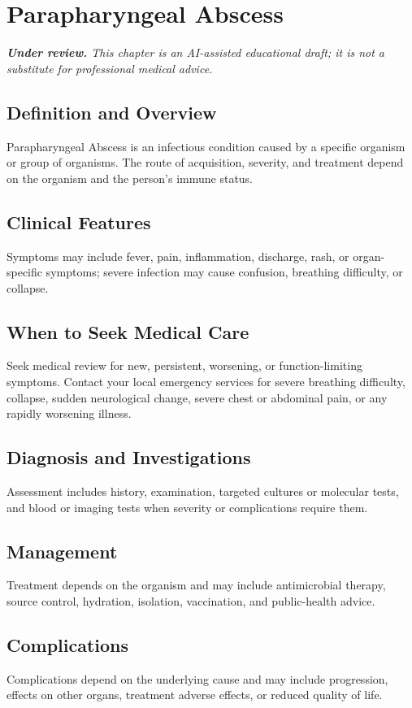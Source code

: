 \chapter{Parapharyngeal Abscess}

\medskip
\noindent\textit{\textbf{Under review.} This chapter is an AI-assisted educational draft; it is not a substitute for professional medical advice.}

\section*{Definition and Overview}
Parapharyngeal Abscess is an infectious condition caused by a specific organism or group of organisms. The route of acquisition, severity, and treatment depend on the organism and the person's immune status.

\section*{Clinical Features}
Symptoms may include fever, pain, inflammation, discharge, rash, or organ-specific symptoms; severe infection may cause confusion, breathing difficulty, or collapse.

\section*{When to Seek Medical Care}
Seek medical review for new, persistent, worsening, or function-limiting symptoms. Contact your local emergency services for severe breathing difficulty, collapse, sudden neurological change, severe chest or abdominal pain, or any rapidly worsening illness.

\section*{Diagnosis and Investigations}
Assessment includes history, examination, targeted cultures or molecular tests, and blood or imaging tests when severity or complications require them.

\section*{Management}
Treatment depends on the organism and may include antimicrobial therapy, source control, hydration, isolation, vaccination, and public-health advice.

\section*{Complications}
Complications depend on the underlying cause and may include progression, effects on other organs, treatment adverse effects, or reduced quality of life.


